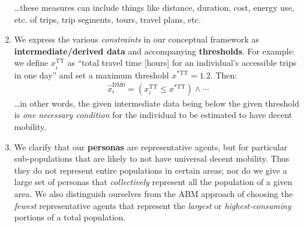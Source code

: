 \documentclass[a5paper,11pt]{article}
\newcommand{\DM}{\text{DM}}
\begin{document}
\begin{enumerate}[label=P\arabic*]
\begin{itemize}
    \end{itemize}
    …these measures can include things like distance, duration, cost, energy use, etc. of trips, trip segments, tours, travel plans, etc.
  \item We express the various \emph{constraints} in our conceptual framework as \textbf{intermediate/derived data} and accompanying \textbf{thresholds}.
    For example: we define $x^{\text{TT}}_i$ as “total travel time [hours] for an individual's accessible trips in one day” and set a maximum threshold $x^{\ast \text{TT}} = 1.2$.
    Then:
    \begin{align}
      \hat{x}^{\DM0}_i =
    \left( x^{\text{TT}}_i \leq x^{\ast \text{TT}} \right) \land \cdots
    \end{align}
    …in other words, the given intermediate data being below the given threshold is \emph{one necessary condition} for the individual to be estimated to have decent mobility.
  \item We clarify that our \textbf{personas} are representative agents, but for particular sub-populations that are likely to not have universal decent mobility.
  Thus they do not represent entire populations in certain areas; nor do we give a large set of personas that \emph{collectively} represent all the population of a given area.
  We also distinguish ourselves from the ABM approach of choosing the \emph{fewest} representative agents that represent the \emph{largest} or \emph{highest-consuming} portions of a total population.
\end{enumerate}

\end{document}
